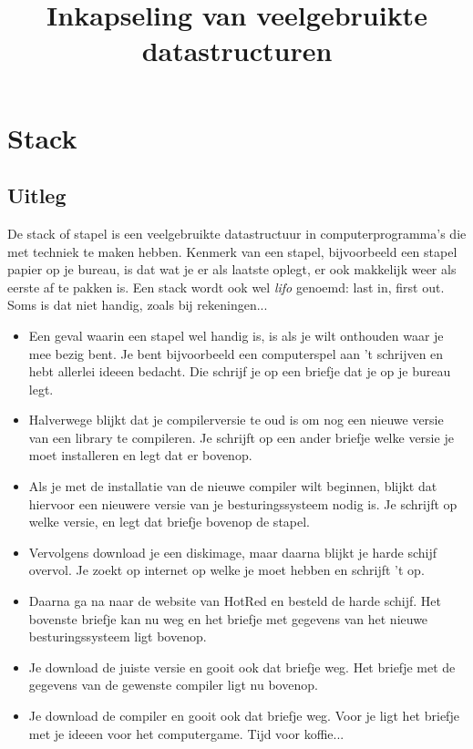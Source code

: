 \documentclass[a4paper,11pt]{article}
\begin{document}
\title{Inkapseling van veelgebruikte datastructuren}
\date{}

\maketitle

\section{Stack}

\subsection{Uitleg}

De stack of stapel is een veelgebruikte datastructuur in computerprogramma's die met techniek te maken hebben.
Kenmerk van een stapel, bijvoorbeeld een stapel papier op je bureau, is dat wat je er als laatste oplegt, er ook makkelijk weer als eerste af te pakken is.
Een stack wordt ook wel \emph{lifo} genoemd: last in, first out.
Soms is dat niet handig, zoals bij rekeningen...

\begin{itemize}
\item Een geval waarin een stapel wel handig is, is als je wilt onthouden waar je mee bezig bent.
Je bent bijvoorbeeld een computerspel aan 't schrijven en hebt allerlei ideeen bedacht.
Die schrijf je op een briefje dat je op je bureau legt.

\item Halverwege blijkt dat je compilerversie te oud is om nog een nieuwe versie van een library te compileren.
Je schrijft op een ander briefje welke versie je moet installeren en legt dat er bovenop.

\item Als je met de installatie van de nieuwe compiler wilt beginnen,
blijkt dat hiervoor een nieuwere versie van je besturingssysteem nodig is.
Je schrijft op welke versie, en legt dat briefje bovenop de stapel.

\item Vervolgens download je een diskimage, maar daarna blijkt je harde schijf overvol.
Je zoekt op internet op welke je moet hebben en schrijft 't op.

\item Daarna ga na naar de website van HotRed en besteld de harde schijf.
Het bovenste briefje kan nu weg en het briefje met gegevens van het nieuwe besturingssysteem ligt bovenop.

\item Je download de juiste versie en gooit ook dat briefje weg.
Het briefje met de gegevens van de gewenste compiler ligt nu bovenop.

\item Je download de compiler en gooit ook dat briefje weg.
Voor je ligt het briefje met je ideeen voor het computergame.
Tijd voor koffie...
\end{itemize}
\end{document}
